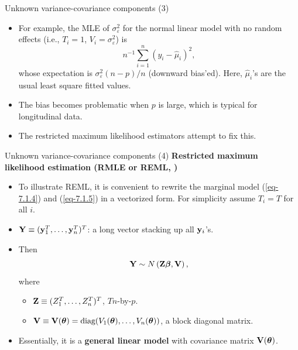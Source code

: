 \documentclass{beamer}
\newcommand{\boldtheta}{{\boldsymbol \theta}}
\newenvironment{wideitemize}%
  {\begin{itemize}%
    \setlength{\parskip}{1em}}%
  {\end{itemize}}
\begin{document}
\begin{frame}{Unknown variance-covariance components (3)}

\begin{wideitemize}

\item   For example, the MLE of $\sigma_\varepsilon^2$ for the normal linear model with no random effects (i.e., $T_i = 1$, $V_i = \sigma_\varepsilon^2 $) is 
\[
n^{-1}\sum_{i = 1}^n (y_i - \hat{\mu}_i)^2 ,
\]
whose expectation is $\sigma_\varepsilon^2 (n-p)/n$ (downward bias'ed). Here, $\hat{\mu}_i$'s are the usual least square fitted values.

\item The bias becomes problematic when $p$ is large, which is typical for longitudinal data. 


\item The restricted maximum likelihood estimators attempt to fix this.
\end{wideitemize}

\end{frame}
\begin{frame}{Unknown variance-covariance components (4)}
\noindent\textbf{Restricted maximum likelihood estimation (RMLE or REML, \cite{REML_paper})}
\begin{wideitemize}

\item To illustrate REML, it is convenient to rewrite the marginal model  (\ref{eq-7.1.4}) and (\ref{eq-7.1.5}) in a  vectorized form. For simplicity assume $T_i = T$ for all $i$.

\item  ${\bf Y} \equiv ({\bf y}_1^T, \dots, {\bf y}_n^T)^T$: a long vector stacking up all  ${\bf y}_i$'s. 




\item  Then \[
 {\bf Y} \sim N\left({\bf Z}{\boldsymbol \beta}, {\bf V} \right),
 \]
where 
\begin{wideitemize}
\item ${\bf Z} \equiv (Z_1^T, \dots, Z_n^T)^T$, $Tn$-by-$p$.
\item 
${\bf V} \equiv {\bf V} (\boldtheta) = \text{diag}(V_1({\boldtheta}), \dots, V_n({\boldtheta}))$, a block diagonal matrix. 

\end{wideitemize}


\item Essentially, it is a {\bf general linear model} with covariance matrix  ${\bf V}({\boldsymbol \theta})$.

\end{wideitemize}

\end{frame}
\end{document}
